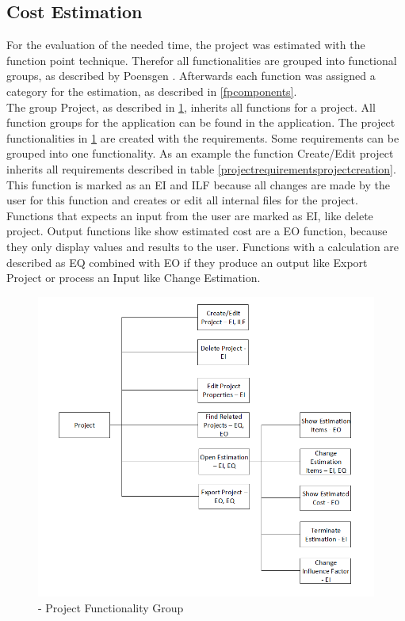 \subsection{Cost Estimation}
For the evaluation of the needed time, the project was estimated with the function point technique. Therefor all functionalities are grouped into functional groups, as described by Poensgen \cite{FPKompakt}. Afterwards each function was assigned a category for the estimation, as described in \ref{fpcomponents}.\\
The group Project, as described in \ref{fig:projectFunctionalityGroup}, inherits all functions for a project. All function groups for the application can be found in the application.
The project functionalities in \ref{fig:projectFunctionalityGroup} are created with the requirements. Some requirements can be grouped into one functionality. As an example the function Create/Edit project inherits all requirements described in table \ref{projectrequirementsprojectcreation}. This function is marked as an EI and ILF because all changes are made by the user for this function and creates or edit all internal files for the project. \\
Functions that expects an input from the user are marked as EI, like delete project. Output functions like show estimated cost are a EO function, because they only display values and results to the user. Functions with a calculation are described as EQ combined with EO if they produce an output like Export Project or process an Input like Change Estimation.
\\
\begin{figure}[h] 
	\centering 
	\includegraphics[width=14cm]{images/ScreenOverviewProject.PNG} 
	\caption{- Project Functionality Group} 
	\label{fig:projectFunctionalityGroup}
\end{figure}\\
